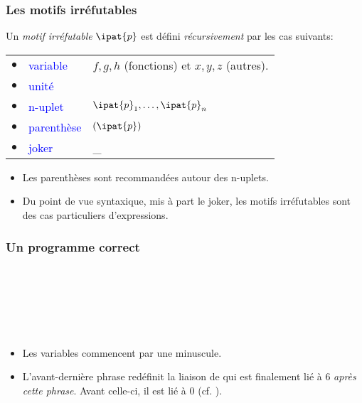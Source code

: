 %
\begin{frame}
\frametitle{Les motifs irréfutables}

Un \emph{motif irréfutable} $\ipat{p}$ est défini \emph{récursivement}
par les cas suivants:

\begin{tabular}{rll}
    $\bullet$
  & \textcolor{blue}{variable}
  & $f, g, h$ (fonctions) et $x, y, z$ (autres). \\
    $\bullet$
  & \textcolor{blue}{unité}
  & \unit\\
    $\bullet$
  & \textcolor{blue}{n-uplet}
  & $\ipat{p}_1, \ldots, \ipat{p}_n$\\
    $\bullet$
  & \textcolor{blue}{parenthèse}
  & $(\ipat{p})$\\
    $\bullet$
  & \textcolor{blue}{joker}
  & {\Large \_}
\end{tabular}

\remarques

\begin{itemize}

  \item Les parenthèses sont recommandées autour des n-uplets.

  \item Du point de vue syntaxique, mis à part le joker, les motifs
  irréfutables sont des cas particuliers d'expressions.


\end{itemize}

\end{frame}

%
\begin{frame}
\frametitle{Un programme correct}

\\
\\
\\
\\
\\


\begin{itemize}

  \item Les variables commencent par une minuscule.

  \item L'avant-dernière phrase redéfinit la liaison de  qui
  est finalement lié à \num{6} \emph{après cette phrase}. Avant
  celle-ci, il est lié à \num{0} (cf. ).

\end{itemize}

\end{frame}

